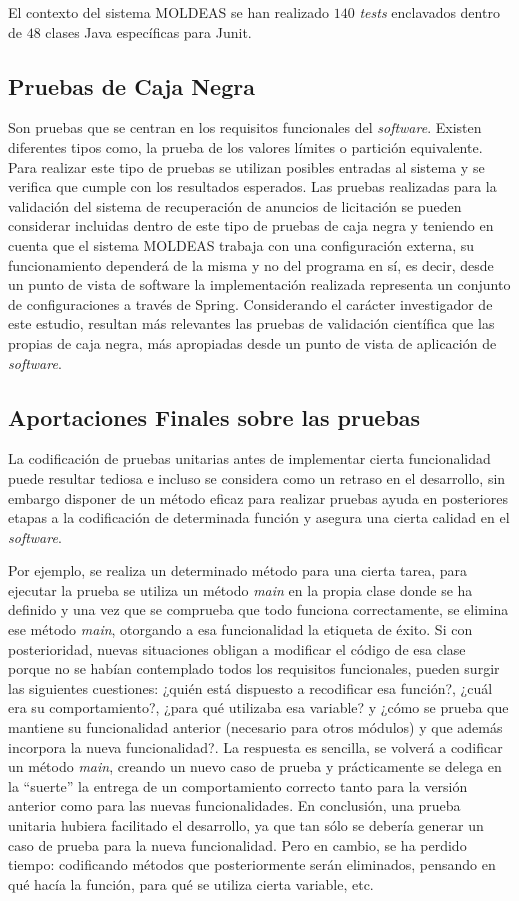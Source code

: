 El contexto del sistema \gls{MOLDEAS} se han realizado $140$ \textit{tests} enclavados 
dentro de $48$ clases Java específicas para Junit.

\subsection{Pruebas de Caja Negra}
Son pruebas que se centran en los requisitos funcionales del
\textit{software}. Existen diferentes tipos como, la prueba de los valores
límites o partición equivalente. Para realizar este tipo de pruebas se utilizan
posibles entradas al sistema y se verifica que cumple con los resultados
esperados. Las pruebas realizadas para la validación del sistema de recuperación 
de anuncios de licitación se pueden considerar incluidas dentro de este tipo de pruebas de caja negra y teniendo en cuenta
que el sistema \gls{MOLDEAS} trabaja con una configuración externa, su funcionamiento
dependerá de la misma y no del programa en sí, es decir, desde un punto de vista
de software la implementación realizada representa un conjunto de 
configuraciones a través de Spring. Considerando el carácter investigador 
de este estudio, resultan más relevantes las pruebas de
validación científica que las propias de caja negra, más apropiadas 
desde un punto de vista de aplicación de \textit{software}.


\subsection{Aportaciones Finales sobre las pruebas}
La codificación de pruebas unitarias antes de implementar cierta funcionalidad
puede resultar tediosa e incluso se considera como un retraso en el desarrollo, sin embargo disponer de un 
método eficaz para realizar pruebas ayuda en
posteriores etapas a la codificación de determinada función y asegura una cierta
calidad en el \textit{software}. 

Por ejemplo, se realiza un determinado método para una cierta tarea, para ejecutar la prueba se utiliza 
un método \textit{main} en la propia clase donde se ha definido y una vez que se comprueba que todo
funciona correctamente, se elimina ese método \textit{main}, otorgando a esa
funcionalidad la etiqueta de éxito. Si con posterioridad, nuevas situaciones obligan a 
modificar el código de esa clase porque no se habían contemplado todos los
requisitos funcionales, pueden surgir las siguientes cuestiones: ¿quién está dispuesto a recodificar esa función?, ¿cuál era su comportamiento?, 
¿para qué utilizaba esa variable? y ¿cómo se prueba que mantiene su funcionalidad anterior (necesario para otros módulos) y 
que además incorpora la nueva funcionalidad?. La respuesta es sencilla, se volverá a codificar un método
\textit{main}, creando un nuevo caso de prueba y prácticamente se delega en la ``suerte'' la entrega de 
un comportamiento correcto tanto para la versión anterior como para las nuevas funcionalidades. En 
conclusión, una prueba unitaria hubiera facilitado el desarrollo, ya que tan sólo se debería generar un
caso de prueba para la nueva funcionalidad. Pero en cambio, se ha perdido tiempo: codificando métodos que posteriormente 
serán eliminados, pensando en qué hacía la función, para qué se utiliza cierta variable, etc. 

